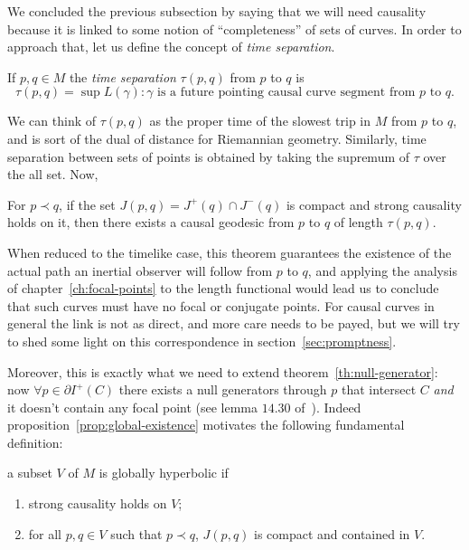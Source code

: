 We concluded the previous subsection by saying that we will need causality because it is linked to some notion of ``completeness'' of sets of curves. In order to approach that, let us define the concept of \emph{time separation}.
\begin{definition}
	If \(p,q\in M\) the \emph{time separation} \(\tau (p,q)\) from \(p\) to \(q\) is
	\[
		\tau (p,q) = \sup{L(\gamma): \gamma\text{ is a future pointing causal curve segment from } p \text{ to } q}.
	\]
\end{definition}
We can think of \(\tau (p,q)\) as the proper time of the slowest trip in \(M\) from \(p\) to \(q\), and is sort of the dual of distance for Riemannian geometry.
Similarly, time separation between sets of points is obtained by taking the supremum of \(\tau\) over the all set. Now,
\begin{prop}
	\label{prop:global-existence}
	For \(p \prec q\), if the set \(J(p, q) = J^+(q) \cap J^-(q)\) is compact and strong causality holds on it, then there exists a causal geodesic from \(p\) to \(q\) of length \(\tau (p,q)\).
\end{prop}
When reduced to the timelike case, this theorem guarantees the existence of the actual path an inertial observer will follow from \(p\) to \(q\), and applying the analysis of chapter~\ref{ch:focal-points} to the length functional would lead us to conclude that such curves must have no focal or conjugate points. For causal curves in general the link is not as direct, and more care needs to be payed, but we will try to shed some light on this correspondence in section~\ref{sec:promptness}.

Moreover, this is exactly what we need to extend theorem~\ref{th:null-generator}: now \(\forall p\in \partial I^+(C)\)  there exists a null generators through \(p\) that intersect \(C\) \emph{and} it doesn't contain any focal point (see lemma \(14.30\) of~\cite{o1983semi}).
Indeed proposition~\ref{prop:global-existence} motivates the following fundamental definition:
\begin{definition}
	\label{def:global-hyper}
	a subset \(V\) of \(M\) is globally hyperbolic if 
	\begin{enumerate}
		\item strong causality holds on \(V\);
  		\item for all \(p, q \in V\) such that \(p \prec q\), \(J(p,q)\) is compact and contained in \(V\).
	\end{enumerate}
\end{definition}

